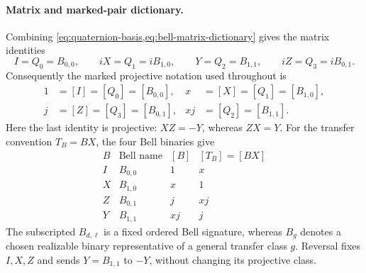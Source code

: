 \documentclass[11pt,letterpaper,onecolumn]{article}
\theoremstyle{plain}
\theoremstyle{definition}
\theoremstyle{remark}
\begin{document}
\paragraph{Matrix and marked-pair dictionary.}
Combining \cref{eq:quaternion-basis,eq:bell-matrix-dictionary} gives the
matrix identities
\hypertarget{eq:global-matrix-aliases}{}
\begin{equation*}
 I=Q_0=B_{0,0},\qquad
 iX=Q_1=iB_{1,0},\qquad
 Y=Q_2=B_{1,1},\qquad
 iZ=Q_3=iB_{0,1}.
\end{equation*}
Consequently the marked projective notation used throughout is
\hypertarget{eq:global-mark-aliases}{}
\begin{equation*}
 \begin{aligned}
  1&=[I]=[Q_0]=[B_{0,0}],&
  x&=[X]=[Q_1]=[B_{1,0}],\\
  j&=[Z]=[Q_3]=[B_{0,1}],&
  xj&=[Q_2]=[B_{1,1}].
 \end{aligned}
\end{equation*}
Here the last identity is projective: \(XZ=-Y\), whereas \(ZX=Y\).  For
the transfer convention \(T_B=BX\), the four Bell binaries give
\begin{equation*}
\begin{array}{c|c|c|c}
 B&\text{Bell name}&[B]&[T_B]=[BX]\\ \hline
 I&B_{0,0}&1&x\\
 X&B_{1,0}&x&1\\
 Z&B_{0,1}&j&xj\\
 Y&B_{1,1}&xj&j
\end{array}
\end{equation*}
The subscripted \(B_{d,\ell}\) is a fixed ordered Bell signature, whereas
\(B_g\) denotes a chosen realizable binary representative of a general
transfer class \(g\).  Reversal fixes \(I,X,Z\) and sends
\(Y=B_{1,1}\) to \(-Y\), without changing its projective class.
\end{document}
